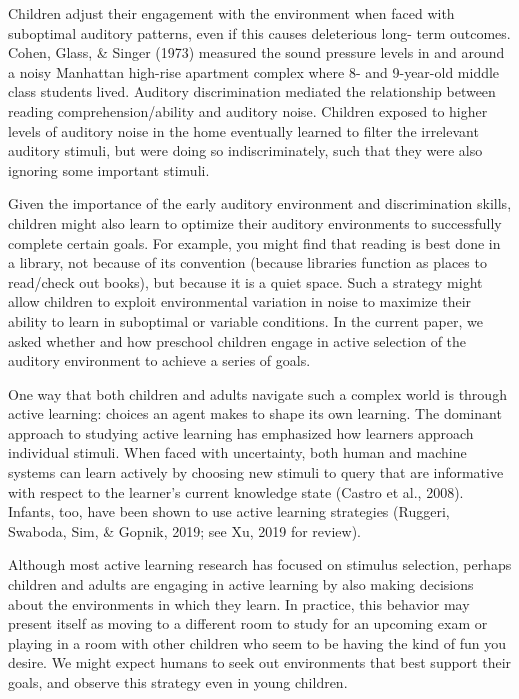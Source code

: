 \documentclass[10pt, letterpaper]{article}
\begin{document}
Children adjust their engagement with the environment when faced with
suboptimal auditory patterns, even if this causes deleterious long- term
outcomes. Cohen, Glass, \& Singer (1973) measured the sound pressure
levels in and around a noisy Manhattan high-rise apartment complex where
8- and 9-year-old middle class students lived. Auditory discrimination
mediated the relationship between reading comprehension/ability and
auditory noise. Children exposed to higher levels of auditory noise in
the home eventually learned to filter the irrelevant auditory stimuli,
but were doing so indiscriminately, such that they were also ignoring
some important stimuli.

Given the importance of the early auditory environment and
discrimination skills, children might also learn to optimize their
auditory environments to successfully complete certain goals. For
example, you might find that reading is best done in a library, not
because of its convention (because libraries function as places to
read/check out books), but because it is a quiet space. Such a strategy
might allow children to exploit environmental variation in noise to
maximize their ability to learn in suboptimal or variable conditions. In
the current paper, we asked whether and how preschool children engage in
active selection of the auditory environment to achieve a series of
goals.

One way that both children and adults navigate such a complex world is
through active learning: choices an agent makes to shape its own
learning. The dominant approach to studying active learning has
emphasized how learners approach individual stimuli. When faced with
uncertainty, both human and machine systems can learn actively by
choosing new stimuli to query that are informative with respect to the
learner's current knowledge state (Castro et al., 2008). Infants, too,
have been shown to use active learning strategies (Ruggeri, Swaboda,
Sim, \& Gopnik, 2019; see Xu, 2019 for review).

Although most active learning research has focused on stimulus
selection, perhaps children and adults are engaging in active learning
by also making decisions about the environments in which they learn. In
practice, this behavior may present itself as moving to a different room
to study for an upcoming exam or playing in a room with other children
who seem to be having the kind of fun you desire. We might expect humans
to seek out environments that best support their goals, and observe this
strategy even in young children.
\end{document}
